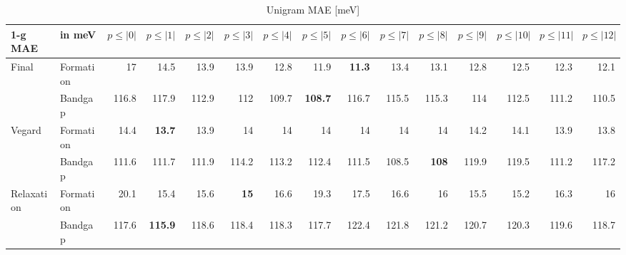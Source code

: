 \documentclass[11pt,oneside,czech,american]{book} %
\theoremstyle{definition} %
\theoremstyle{definition}
\begin{document}
\begin{table}[H]
	\scriptsize
	\centering
\begin{tabular}{llrrrrrrrrrrrrr}
	\hline
	1-g MAE    & in meV    &   $p{\leq}|0|$ &   $p{\leq}|1|$ &   $p{\leq}|2|$ &   $p{\leq}|3|$ &   $p{\leq}|4|$ &   $p{\leq}|5|$ &   $p{\leq}|6|$ &   $p{\leq}|7|$ &   $p{\leq}|8|$ &   $p{\leq}|9|$ &   $p{\leq}|10|$ &   $p{\leq}|11|$ &   $p{\leq}|12|$ \\
	\hline
	\multirow{2}{*}{Final}      & Formation &       17   &       14.5 &       13.9 &       13.9 &       12.8 &       11.9 &       \textbf{11.3} &       13.4 &       13.1 &       12.8 &        12.5 &        12.3 &        12.1 \\
	      & Bandgap   &      116.8 &      117.9 &      112.9 &      112   &      109.7 &      \textbf{108.7} &      116.7 &      115.5 &      115.3 &      114   &       112.5 &       111.2 &       110.5 \\
	\multirow{2}{*}{Vegard}     & Formation &       14.4 &       \textbf{13.7} &       13.9 &       14   &       14   &       14   &       14   &       14   &       14   &       14.2 &        14.1 &        13.9 &        13.8 \\
	     & Bandgap   &      111.6 &      111.7 &      111.9 &      114.2 &      113.2 &      112.4 &      111.5 &      108.5 &      \textbf{108}   &      119.9 &       119.5 &       111.2 &       117.2 \\
	\multirow{2}{*}{Relaxation} & Formation &       20.1 &       15.4 &       15.6 &       \textbf{15}   &       16.6 &       19.3 &       17.5 &       16.6 &       16   &       15.5 &        15.2 &        16.3 &        16   \\
	 & Bandgap   &      117.6 &      \textbf{115.9} &      118.6 &      118.4 &      118.3 &      117.7 &      122.4 &      121.8 &      121.2 &      120.7 &       120.3 &       119.6 &       118.7 \\
	\hline
\end{tabular}
	\caption{Unigram MAE [meV]}
	\label{1-g MAE hat}
\end{table}
\end{document}
